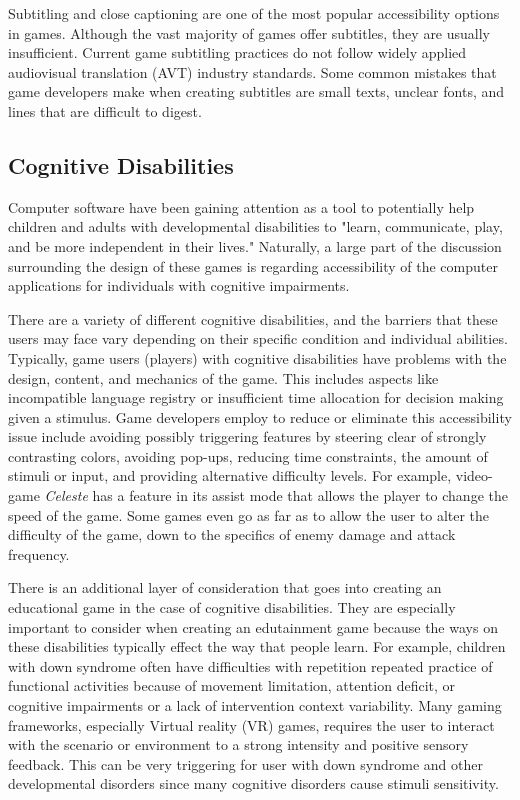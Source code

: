 \documentclass[10pt,twocolumn]{article}
\begin{document}
Subtitling and close captioning are one of the most popular accessibility options in games. Although the vast majority of games offer subtitles, they are usually insufficient. Current game subtitling practices do not follow widely applied audiovisual translation (AVT) industry standards. \cite{mangiron2013subtitling} Some common mistakes that game developers make when creating subtitles are small texts, unclear fonts, and lines that are difficult to digest. 
    



\subsection{Cognitive Disabilities}
Computer software have been gaining attention as a tool to potentially help children and adults with developmental disabilities to "learn, communicate, play, and be more independent in their lives." \cite{dandashi2015enhancing} Naturally, a large part of the discussion surrounding the design of these games is regarding accessibility of the  computer applications for individuals with cognitive impairments. 

There are a variety of different cognitive disabilities, and the barriers that these users may face vary depending on their specific condition and individual abilities. \cite{torrente2014towards} Typically, game users (players) with cognitive disabilities have problems with the design, content, and mechanics of the game. \cite{torrente2014towards} This includes aspects like incompatible language registry or insufficient time allocation for decision making given a stimulus. Game developers employ to reduce or eliminate this accessibility issue include avoiding possibly triggering features by steering clear of strongly contrasting colors, avoiding pop-ups, reducing time constraints, the amount of stimuli or input, and providing alternative difficulty levels. \cite{torrente2014towards} For example, video-game \textit{Celeste} \cite{celeste} has a feature in its assist mode that allows the player to change the speed of the game. Some games even go as far as to allow the user to alter the difficulty of the game, down to the specifics of enemy damage and attack frequency. 

There is an additional layer of consideration that goes into creating an educational game in the case of cognitive disabilities. They are especially important to consider when creating an edutainment game because the ways on these disabilities typically effect the way that people learn. For example, children with down syndrome often have difficulties with repetition repeated practice of functional activities because of movement limitation, attention deficit, or cognitive impairments or a lack of intervention context variability. \cite{wuang2011effectiveness} Many gaming frameworks, especially Virtual reality (VR) games, requires the user to interact with the scenario or environment to a strong intensity and positive sensory feedback. \cite{wuang2011effectiveness} This can be very triggering for user with down syndrome and other developmental disorders since many cognitive disorders cause stimuli sensitivity. 
\end{document}
